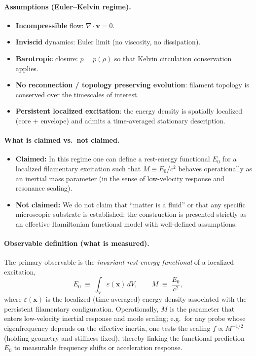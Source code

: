 \documentclass[11pt]{article}
\theoremstyle{definition}
\theoremstyle{plain}
\theoremstyle{remark}
\begin{document}
\paragraph{Assumptions (Euler--Kelvin regime).}
\begin{itemize}
    \item \textbf{Incompressible} flow: $\nabla\!\cdot\mathbf{v}=0$.
    \item \textbf{Inviscid} dynamics: Euler limit (no viscosity, no dissipation).
    \item \textbf{Barotropic} closure: $p=p(\rho)$ so that Kelvin circulation conservation applies.
    \item \textbf{No reconnection / topology preserving evolution}: filament topology is conserved over the timescales of interest.
    \item \textbf{Persistent localized excitation}: the energy density is spatially localized (core + envelope) and admits a time-averaged stationary description.
\end{itemize}

\paragraph{What is claimed vs.\ not claimed.}
\begin{itemize}
    \item \textbf{Claimed:} In this regime one can define a rest-energy functional $E_0$ for a localized filamentary excitation such that $M \equiv E_0/c^2$ behaves operationally as an inertial mass parameter (in the sense of low-velocity response and resonance scaling).
    \item \textbf{Not claimed:} We do not claim that ``matter is a fluid'' or that any specific microscopic substrate is established; the construction is presented strictly as an effective Hamiltonian functional model with well-defined assumptions.
\end{itemize}

\paragraph{Observable definition (what is measured).}
The primary observable is the \emph{invariant rest-energy functional} of a localized excitation,
\begin{equation}
E_0 \;\equiv\; \int_V \varepsilon(\mathbf{x})\,dV,
\qquad
M \;\equiv\; \frac{E_0}{c^2},
\label{eq:obs_partI_mass_def}
\end{equation}
where $\varepsilon(\mathbf{x})$ is the localized (time-averaged) energy density associated with the persistent filamentary configuration.
Operationally, $M$ is the parameter that enters low-velocity inertial response and mode scaling; e.g.\ for any probe whose eigenfrequency depends on the effective inertia, one tests the scaling $f \propto M^{-1/2}$ (holding geometry and stiffness fixed), thereby linking the functional prediction $E_0$ to measurable frequency shifts or acceleration response.
\end{document}
